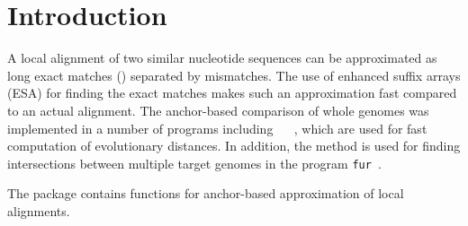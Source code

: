 \section{Introduction}
A local alignment of two similar nucleotide sequences can be
approximated as long exact matches () separated by
mismatches. The use of enhanced suffix arrays (ESA) for finding the
exact matches makes such an approximation fast compared to an actual
alignment. The anchor-based comparison of whole genomes was
implemented in a number of programs
including ~\cite{hau15:and} ~\cite{kloe19:phy},
which are used for fast computation of evolutionary distances. In
addition, the method is used for finding intersections between
multiple target genomes in the program \texttt{fur}~\cite{hau21:fur}.

The package  contains functions for anchor-based
approximation of local alignments.
\newpage
